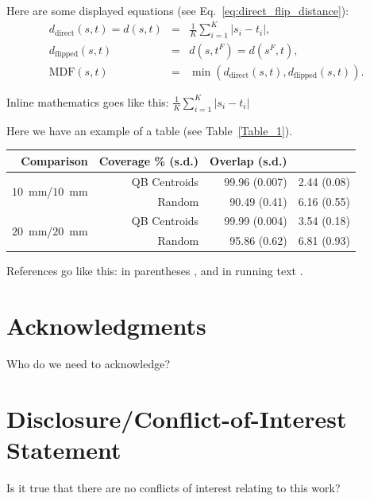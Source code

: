 \documentclass{bioinfo}
\begin{document}
Here are some displayed equations (see Eq.~\ref{eq:direct_flip_distance}):
\begin{eqnarray}
  d_{\textrm{direct}}(s, t) = d(s, t) & = & \frac{1}{K}\sum_{i=1}^{K}|s_{i}-t_{i}|,\nonumber\\
  d_{\textrm{flipped}}(s, t) & = & d(s,t^F) = d(s^F,t),\nonumber\\
  \textrm{MDF}(s, t) & = & \min(d_{\textrm{direct}}(s, t), d_{\textrm{flipped}}(s, t))\label{eq:direct_flip_distance}.
\end{eqnarray}

Inline mathematics goes like this: $\frac{1}{K}\sum_{i=1}^{K}|s_{i}-t_{i}|$

Here we have an example of a table (see Table~\ref{Table_1}).

\begin{table}[th]  {\begin{tabular}{rrrr} %
Comparison & Coverage \% (s.d.) & Overlap (s.d.) \\ \hline
\multirow{2}{*}{$10$~mm/$10$~mm} & QB Centroids & 99.96 (0.007) & 2.44
(0.08)\\ & Random & 90.49 (0.41) & 6.16 (0.55)\\ \hline
\multirow{2}{*}{$20$~mm/$20$~mm} & QB Centroids & 99.99 (0.004) & 3.54
(0.18)\\ & Random & 95.86 (0.62) & 6.81 (0.93)\\ \hline
\end{tabular}}{}
\end{table}

References go like this: in parentheses
\citep{Garyfallidis_thesis,Mori1999}, and in running text
\citet{Garyfallidis_thesis}.

\section*{Acknowledgments}
Who do we need to acknowledge?

\section*{Disclosure/Conflict-of-Interest Statement}
Is it true that there are no conflicts of interest relating to this
work?

%

%
%
%
%

\end{document}
